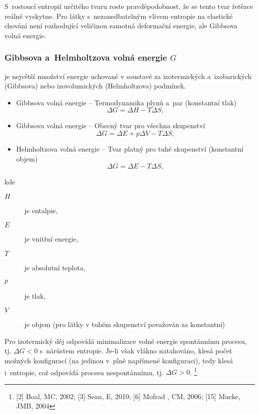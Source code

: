S~rostoucí entropií určitého tvaru roste pravděpodobnost, že se tento tvar řetězce reálně vyskytne.
Pro látky s~nezanedbatelným vlivem entropie na elastické chování není rozhodující veličinou samotná deformační energie, ale Gibbsova volná energie.

\subsubsection{Gibbsova a~Helmholtzova volná energie $G$}
je největší množství energie uchované v soustavě za izotermických a~izobarických (Gibbsova) nebo izovolumických (Helmholtzova) podmínek.

\begin{itemize}
	\item Gibbsova volná energie -- Termodynamika plynů a~par (konstantní tlak)
	\begin{equation}
	\Delta G = \Delta H - T \Delta S,
	\end{equation}
	\item Gibbsova volná energie -- Obecný tvar pro všechna skupenství
	\begin{equation}
	\Delta G = \Delta E + p \Delta V - T \Delta S,
	\end{equation}
	\item Helmholtzova volná energie -- Tvar platný pro tuhé skupenství (konstantní objem)
	\begin{equation}
	\Delta G = \Delta E - T \Delta S,
	\end{equation}
\end{itemize}
kde
\begin{description}
	\item[$H$] je entalpie,
	\item[$E$] je vnitřní  energie,
	\item[$T$] je absolutní teplota,
	\item[$p$] je tlak,
	\item[$V$] je objem (pro látky v tuhém skupenství považován za konstantní)
\end{description}

Pro izotermický děj odpovídá minimalizace volné energie spontánnímu procesu, tj. $\Delta G < 0$ s~nárůstem entropie.
Je-li však vlákno natahováno, klesá počet možných konfigurací (na jedinou v~plně napřímené konfiguraci), tedy klesá i~entropie, což odpovídá procesu nespontánnímu, tj. $\Delta G > 0$.
\footnote{[2] Boal, MC, 2002; [3] Sean, E, 2010; [6] Mofrad , CM, 2006; [15] Mucke, JMB, 2004}

